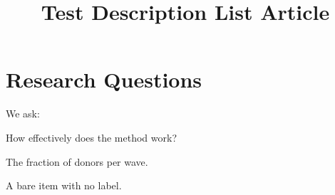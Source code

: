 \documentclass{ccr}
\title{Test Description List Article}
\begin{document}
\maketitle

\section{Research Questions}
We ask:

\begin{description}
  \item[RQ1:] How effectively does the method work?
  \item[\textbf{Donor Rate:}] The fraction of donors per wave.
  \item A bare item with no label.
\end{description}

\printbibliography
\end{document}
